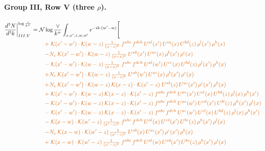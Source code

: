 \documentclass[10pt]{article}
\numberwithin{equation}{section}
\newcommand{\NNv}{\mathcal N\log\frac{\vee}{k^+}}
\begin{document}
\paragraph{Group III, Row V (three $\rho$).}
\begin{align}
\frac{d^3N}{d^3k}\bigg|^{\log\frac{\vee}{k^+}}_{III.V}={}&\NNv\int_{x,x',z,w,w'}e^{-ik\cdot(w'-w)}\Bigg[\notag\\
&\quad{\color{BFK}+\;\mathcal{K}(x'-w')\cdot\mathcal{K}(w-z)\,\tfrac{1}{(x-z)^{2}}\;f^{abc}\,f^{deh}\,U^{al}(x')\,U^{ce}(x)\,U^{bd}(z)\,\rho^{l}(x')\,\rho^{h}(x)}\notag\\
&\quad{\color{BFK}-N_c\;\mathcal{K}(x'-w')\cdot\mathcal{K}(w-z)\,\tfrac{1}{(x-z)^{2}}\;U^{ab}(x')\,U^{ac}(x)\,\rho^{b}(x')\,\rho^{c}(x)}\notag\\
&\quad{\color{BFK}-\;\mathcal{K}(x'-w')\cdot\mathcal{K}(w-z)\,\tfrac{1}{(x-z)^{2}}\;f^{abc}\,f^{deh}\,U^{al}(w')\,U^{ce}(x)\,U^{bd}(z)\,\rho^{l}(x')\,\rho^{h}(x)}\notag\\
&\quad{\color{BFK}+N_c\;\mathcal{K}(x'-w')\cdot\mathcal{K}(w-z)\,\tfrac{1}{(x-z)^{2}}\;U^{ab}(w')\,U^{ac}(x)\,\rho^{b}(x')\,\rho^{c}(x)}\notag\\
&\quad{\color{BFK}+N_c\;\mathcal{K}(x'-w')\cdot\mathcal{K}(w-z)\,\mathcal{K}(x-z)\cdot\mathcal{K}(x'-z)\;U^{ab}(z)\,U^{ac}(x')\,\rho^{c}(x')\,\rho^{b}(x)}\notag\\
&\quad{\color{BFK}+\;\mathcal{K}(x'-w')\cdot\mathcal{K}(w-z)\,\mathcal{K}(x-z)\cdot\mathcal{K}(x'-z)\;f^{abc}\,f^{deh}\,U^{ae}(x')\,U^{cl}(x)\,U^{bd}(z)\,\rho^{l}(x)\,\rho^{h}(x')}\notag\\
&\quad{\color{BFK}-\;\mathcal{K}(x'-w')\cdot\mathcal{K}(w-z)\,\mathcal{K}(x-z)\cdot\mathcal{K}(x'-z)\;f^{abc}\,f^{deh}\,U^{ae}(w')\,U^{cd}(x')\,U^{bl}(z)\,\rho^{h}(x')\,\rho^{l}(x)}\notag\\
&\quad{\color{BFK}-\;\mathcal{K}(x'-w')\cdot\mathcal{K}(w-z)\,\mathcal{K}(x-z)\cdot\mathcal{K}(x'-z)\;f^{abc}\,f^{deh}\,U^{ae}(w')\,U^{cl}(x)\,U^{bd}(z)\,\rho^{l}(x)\,\rho^{h}(x')}\notag\\
&\quad{\color{BFK}-\;\mathcal{K}(x-w)\cdot\mathcal{K}(w'-z)\,\tfrac{1}{(x'-z)^{2}}\;f^{abc}\,f^{deh}\,U^{al}(x)\,U^{cd}(x')\,U^{be}(z)\,\rho^{h}(x')\,\rho^{l}(x)}\notag\\
&\quad{\color{BFK}-N_c\;\mathcal{K}(x-w)\cdot\mathcal{K}(w'-z)\,\tfrac{1}{(x'-z)^{2}}\;U^{ab}(x)\,U^{ac}(x')\,\rho^{c}(x')\,\rho^{b}(x)}\notag\\
&\quad{\color{BFK}+\;\mathcal{K}(x-w)\cdot\mathcal{K}(w'-z)\,\tfrac{1}{(x'-z)^{2}}\;f^{abc}\,f^{deh}\,U^{al}(w)\,U^{cd}(x')\,U^{be}(z)\,\rho^{h}(x')\,\rho^{l}(x)}\notag\\

\end{align}
\end{document}
